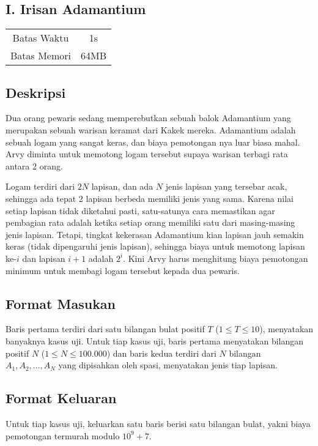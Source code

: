 \documentclass{article}
\begin{document}
\begin{center}
    \section*{I. Irisan Adamantium} %

    \begin{tabular}{ | c c | }
        \hline
        Batas Waktu  & 1s \\    %
        Batas Memori & 64MB \\  %
        \hline
    \end{tabular}
\end{center}

\subsection*{Deskripsi}
Dua orang pewaris sedang memperebutkan sebuah balok Adamantium yang merupakan sebuah warisan keramat dari Kakek mereka.
Adamantium adalah sebuah logam yang sangat keras, dan biaya pemotongan nya luar biasa mahal.
Arvy diminta untuk memotong logam tersebut supaya warisan terbagi rata antara 2 orang.

Logam terdiri dari $2N$ lapisan, dan ada $N$ jenis lapisan yang tersebar acak, sehingga ada tepat 2 lapisan berbeda memiliki jenis yang sama.
Karena nilai setiap lapisan tidak diketahui pasti, satu-satunya cara memastikan agar pembagian rata adalah ketika setiap orang memiliki satu dari masing-masing jenis lapisan.
Tetapi, tingkat kekerasan Adamantium kian lapisan jauh semakin keras (tidak dipengaruhi jenis lapisan), sehingga biaya untuk memotong lapisan ke-$i$ dan lapisan $i+1$ adalah $2^i$.
Kini Arvy harus menghitung biaya pemotongan minimum untuk membagi logam tersebut kepada dua pewaris.

\subsection*{Format Masukan}
Baris pertama terdiri dari satu bilangan bulat positif $T$ ($1 \leq T \leq 10$), menyatakan banyaknya kasus uji.
Untuk tiap kasus uji, baris pertama menyatakan bilangan positif $N$ ($1 \leq N \leq 100.000$) dan baris kedua terdiri dari $N$ bilangan $A_1, A_2, \dots, A_N$ yang dipisahkan oleh spasi, menyatakan jenis tiap lapisan.

\subsection*{Format Keluaran}
Untuk tiap kasus uji, keluarkan satu baris berisi satu bilangan bulat, yakni biaya pemotongan termurah modulo ${10}^9+7$.
\\
\end{document}
